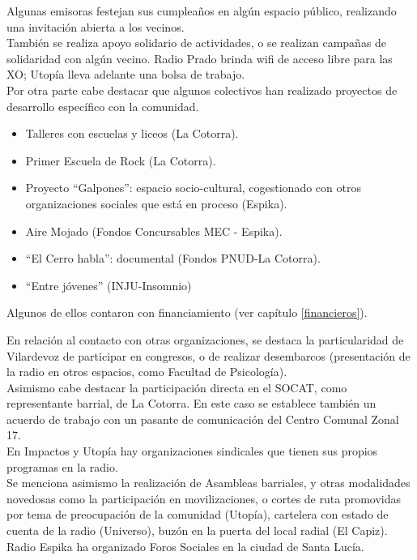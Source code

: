 Algunas emisoras festejan sus cumpleaños en algún espacio público, realizando una invitación abierta a los vecinos.\\

También se realiza apoyo solidario de actividades, o se realizan campañas de solidaridad con algún vecino. Radio Prado brinda wifi de acceso libre para las XO; Utopía lleva adelante una bolsa de trabajo.\\

Por otra parte cabe destacar que algunos colectivos han realizado proyectos de desarrollo específico con la comunidad.\\
\begin{itemize}
  \item Talleres con escuelas y liceos (La Cotorra).
  \item Primer Escuela de Rock (La Cotorra).
  \item Proyecto “Galpones”: espacio socio-cultural, cogestionado con otros organizaciones sociales que está en proceso (Espika).
  \item Aire Mojado (Fondos Concursables MEC - Espika).
  \item “El Cerro habla”: documental (Fondos PNUD-La Cotorra).
  \item “Entre jóvenes” (INJU-Insomnio)
\end{itemize}
Algunos de ellos contaron con financiamiento (ver capítulo \ref{financieros}).

En relación al contacto con otras organizaciones, se destaca la particularidad de Vilardevoz de participar en congresos, o de realizar desembarcos (presentación de la radio en otros espacios, como Facultad de Psicología).\\

Asimismo cabe destacar la participación directa en el SOCAT, como representante barrial, de La Cotorra. En este caso se establece también un acuerdo de trabajo con un pasante de comunicación del Centro Comunal Zonal 17.\\

En Impactos y Utopía hay organizaciones sindicales que tienen sus propios programas en la radio.\\

Se menciona asimismo la realización de Asambleas barriales, y otras modalidades novedosas como la participación en movilizaciones, o cortes de ruta promovidas por tema de preocupación de la comunidad (Utopía), cartelera con estado de cuenta de la radio (Universo), buzón en la puerta del local radial (El Capiz). Radio Espika ha organizado Foros Sociales en la ciudad de Santa Lucía.\\

